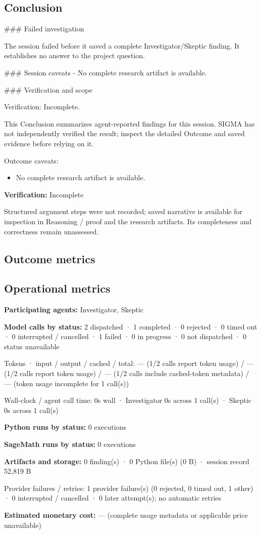 \documentclass[11pt]{article}
\begin{document}
\subsection{Conclusion}
\#\#\# Failed investigation

The session failed before it saved a complete Investigator/Skeptic finding. It establishes no answer to the project question.

\#\#\# Session caveats
- No complete research artifact is available.

\#\#\# Verification and scope

Verification: Incomplete.

This Conclusion summarizes agent-reported findings for this session. SIGMA has not independently verified the result; inspect the detailed Outcome and saved evidence before relying on it.\par
Outcome caveats:\par
\begin{itemize}
\item No complete research artifact is available.
\end{itemize}
\textbf{Verification:} Incomplete\par
Structured argument steps were not recorded; saved narrative is available for inspection in Reasoning / proof and the research artifacts. Its completeness and correctness remain unassessed.\par
\subsection{Outcome metrics}
\subsection{Operational metrics}
\textbf{Participating agents:} Investigator, Skeptic\par
\textbf{Model calls by status:} 2 dispatched · 1 completed · 0 rejected · 0 timed out · 0 interrupted / cancelled · 1 failed · 0 in progress · 0 not dispatched · 0 status unavailable\par
Tokens · input / output / cached / total: — (1/2 calls report token usage) / — (1/2 calls report token usage) / — (1/2 calls include cached-token metadata) / — (token usage incomplete for 1 call(s))\par
Wall-clock / agent call time: 0s wall · Investigator 0s across 1 call(s) · Skeptic 0s across 1 call(s)\par
\textbf{Python runs by status:} 0 executions\par
\textbf{SageMath runs by status:} 0 executions\par
\textbf{Artifacts and storage:} 0 finding(s) · 0 Python file(s) (0 B) · session record 52,819 B\par
Provider failures / retries: 1 provider failure(s) (0 rejected, 0 timed out, 1 other) · 0 interrupted / cancelled · 0 later attempt(s); no automatic retries\par
\textbf{Estimated monetary cost:} — (complete usage metadata or applicable price unavailable)\par
\end{document}
